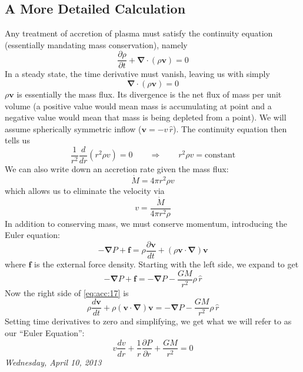\documentclass[10pt]{article}
\numberwithin{equation}{section}
\begin{document}
	\subsection{A More Detailed Calculation} %
	\label{sub:a_more_detailed_calculation}
		Any treatment of accretion of plasma must satisfy the continuity equation (essentially mandating mass conservation), namely
		\begin{equation}
			\label{eq:acc:12} \frac{\partial \rho}{\partial t} + \bm{\nabla}\cdot (\rho\mathbf{v})=0
		\end{equation}
		In a steady state, the time derivative must vanish, leaving us with simply
		\begin{equation}
			\label{eq:acc:13}\bm{\nabla}\cdot(\rho\mathbf{v}) = 0
		\end{equation}
		$\rho\mathbf{v}$ is essentially the mass flux. Its divergence is the net flux of mass per unit volume (a positive value would mean mass is accumulating at point and a negative value would mean that mass is being depleted from a point). We will assume spherically symmetric inflow ($\mathbf{v} = -v\,\hat{r}$). The continuity equation then tells us
		\begin{equation}
			\label{eq:acc:14} \frac{1}{r^2}\frac{d}{dr}\left(r^2\rho v\right) = 0 \qquad \Rightarrow \qquad r^2\rho v = \mathrm{constant}
		\end{equation}
		We can also write down an accretion rate given the mass flux:
		\begin{equation}
			\label{eq:acc:15} \dot{M} = 4\pi r^2\rho v
		\end{equation}
		which allows us to eliminate the velocity via
		\begin{equation}
			\label{eq:acc:16} v = \frac{\dot{M}}{4\pi r^2\rho}
		\end{equation}
		In addition to conserving mass, we must conserve momentum, introducing the Euler equation:
		\begin{equation}
			\label{eq:acc:17} -\bm{\nabla}P + \mathbf{f} = \rho\frac{\partial{\mathbf{v}}}{dt} + (\rho\mathbf{v} \cdot \bm{\nabla}) \mathbf{v}
		\end{equation}
		where $\mathbf{f}$ is the external force density. Starting with the left side, we expand to get
		\begin{equation}
			\label{eq:acc:18} -\bm{\nabla}P + \mathbf{f} = -\bm{\nabla} P - \frac{GM}{r^2}\rho\,\hat{r}
		\end{equation}
		Now the right side of \eqref{eq:acc:17} is
		\begin{equation}
			\label{eq:acc:19} \rho\frac{d\mathbf{v}}{dt} + \rho(\mathbf{v}\cdot\bm{\nabla})\mathbf{v} = -\bm{\nabla}P - \frac{GM}{r^2}\rho\,\hat{r}
		\end{equation}
		Setting time derivatives to zero and simplifying, we get what we will refer to as our ``Euler Equation'':
		\begin{equation}
			\label{eq:acc:20} \boxed{v\frac{dv}{dr} + \frac{1}{r} \frac{\partial P}{\partial r} + \frac{GM}{r^2} = 0}
		\end{equation}
		\emph{Wednesday, April 10, 2013}\\
		
\end{document}
